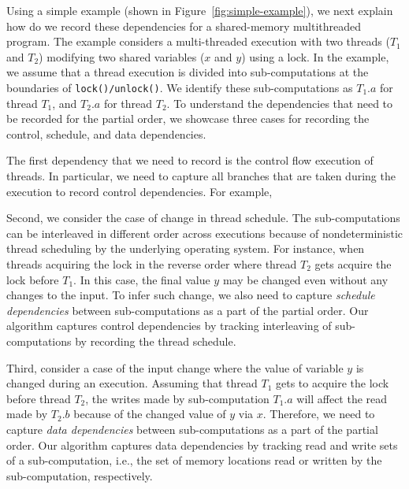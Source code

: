  Using a simple example (shown in Figure~\ref{fig:simple-example}), we next explain how do we record these dependencies for a shared-memory multithreaded program. The example considers a multi-threaded execution with two threads ($T_1$ and $T_2$) modifying two shared variables ($x$ and $y$) using a lock. In the example, we assume that a thread execution is divided into sub-computations at the boundaries of {\tt lock()/unlock()}. We identify these sub-computations as $T_1.a$ for thread $T_1$, and $T_2.a$ for thread $T_2$.   To understand the dependencies that need to be recorded for the partial order, we showcase three cases for recording the control, schedule, and data dependencies.

The first dependency that we need to record is the control flow execution of threads. In particular, we need to capture all branches that are taken during the execution to record control dependencies. For example, 

Second, we consider the case of change in thread schedule. The sub-computations can be interleaved in different order across executions because of nondeterministic thread scheduling by the underlying operating system. For instance, when threads acquiring the lock in the reverse order where thread $T_2$ gets acquire the lock before $T_1$. In this case, the final value $y$ may be changed even without any changes to the input. To infer such change, we also need to capture {\em schedule dependencies}   between sub-computations as a part of the partial order. Our algorithm captures control dependencies by tracking interleaving of sub-computations by recording the thread schedule. 

Third,  consider a case of the input change where the value of variable $y$ is changed during an execution. Assuming that thread $T_1$ gets to acquire the lock before thread $T_2$, the writes made by sub-computation $T_1.a$ will affect the read made by $T_2.b$ because of the changed value of $y$ via  $x$. Therefore, we need to capture {\em data dependencies} between sub-computations as a part of the partial order. Our algorithm captures data dependencies by tracking read and write sets of a sub-computation, i.e., the set of memory locations read or written by the sub-computation, respectively.

 




